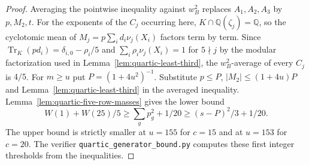 \documentclass[11pt,a4paper]{article}
\numberwithin{equation}{section}
\begin{document}
\begin{proof}
Averaging the pointwise inequality against $w_B^2$ replaces $A_1,A_2,A_3$ by $p,M_2,t$. For the exponents of the $C_j$ occurring here, $K\cap\mathbb Q(\zeta_j)=\mathbb Q$, so the cyclotomic mean of $M_j=p\sum_i d_i\nu_j(X_i)$ factors term by term. Since $\operatorname{Tr}_K(pd_i)=\delta_{i,0}-\rho_i/5$ and $\sum_i\rho_i\nu_j(X_i)=1$ for $5\nmid j$ by the modular factorization used in Lemma~\ref{lem:quartic-least-third}, the $w_B^2$-average of every $C_j$ is $4/5$. For $m\ge u$ put $P=(1+4u^2)^{-1}$. Substitute $p\le P$, $|M_2|\le(1+4u)P$ and Lemma~\ref{lem:quartic-least-third} in the averaged inequality. Lemma~\ref{lem:quartic-five-row-masses} gives the lower bound
\[
 W(1)+W(25)/5\ge\sum_g p_g^2+1/20\ge (s-P)^2/3+1/20.
\]
The upper bound is strictly smaller at $u=155$ for $c=15$ and at $u=153$ for $c=20$. The verifier \texttt{quartic\_generator\_bound.py} computes these first integer thresholds from the inequalities.
\end{proof}
\end{document}
